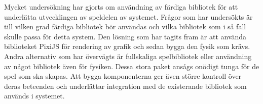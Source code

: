 Mycket undersökning har gjorts om användning av färdiga bibliotek för att underlätta utvecklingen av speldelen av systemet. Frågor som har undersökts är till vilken grad färdiga bibliotek bör användas och vilka bibliotek som i så fall skulle passa för detta system. Den lösning som har tagits fram är att använda biblioteket PixiJS\cite{bib-pixi} för rendering av grafik och sedan bygga den fysik som krävs. Andra alternativ som har övervägts är fullskaliga spelbibliotek eller användning av något bibliotek även för fysiken. Dessa stora paket ansågs onödigt tunga för de spel som ska skapas. Att bygga komponenterna ger även större kontroll över deras beteenden och underlättar integration med de existerande bibliotek som används i systemet.\\

